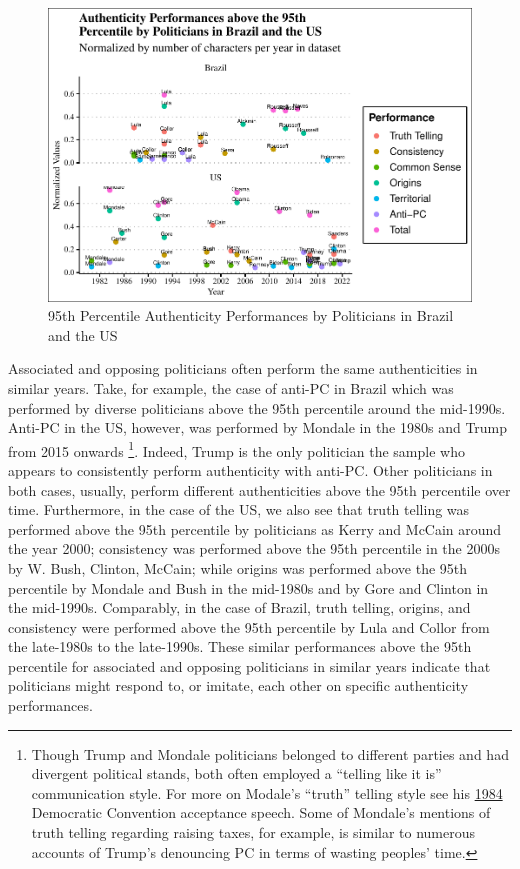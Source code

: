 \documentclass[smallextended]{svjour3}       %
\begin{document}
\begin{figure}
\centering
\includegraphics{antipc_files/figure-latex/Figure 3-1.pdf}
\caption{95th Percentile Authenticity Performances by Politicians in
Brazil and the US}
\end{figure}

Associated and opposing politicians often perform the same
authenticities in similar years. Take, for example, the case of anti-PC
in Brazil which was performed by diverse politicians above the 95th
percentile around the mid-1990s. Anti-PC in the US, however, was
performed by Mondale in the 1980s and Trump from 2015 onwards
\footnote{Though Trump and Mondale politicians belonged to different
  parties and had divergent political stands, both often employed a
  ``telling like it is'' communication style. For more on Modale's
  ``truth'' telling style see his
  \href{https://www.nytimes.com/1984/07/20/us/transcript-of-mondale-address-accepting-party-nomination.html}{1984}
  Democratic Convention acceptance speech. Some of Mondale's mentions of
  truth telling regarding raising taxes, for example, is similar to
  numerous accounts of Trump's denouncing PC in terms of wasting
  peoples' time.}. Indeed, Trump is the only politician the sample who
appears to consistently perform authenticity with anti-PC. Other
politicians in both cases, usually, perform different authenticities
above the 95th percentile over time. Furthermore, in the case of the US,
we also see that truth telling was performed above the 95th percentile
by politicians as Kerry and McCain around the year 2000; consistency was
performed above the 95th percentile in the 2000s by W. Bush, Clinton,
McCain; while origins was performed above the 95th percentile by Mondale
and Bush in the mid-1980s and by Gore and Clinton in the mid-1990s.
Comparably, in the case of Brazil, truth telling, origins, and
consistency were performed above the 95th percentile by Lula and Collor
from the late-1980s to the late-1990s. These similar performances above
the 95th percentile for associated and opposing politicians in similar
years indicate that politicians might respond to, or imitate, each other
on specific authenticity performances.
\end{document}
